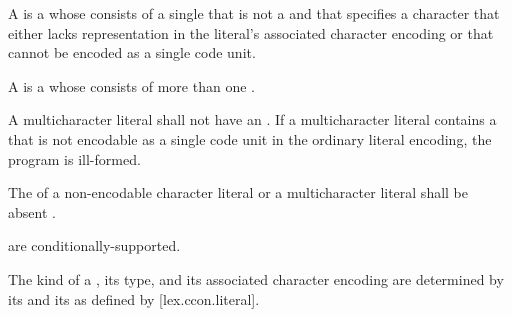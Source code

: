 \documentclass{wg21}
\begin{document}
    \pnum
    \begin{removedblock}
        A 
        is a 
        whose  consists of a single 
        that is not a  and
        that specifies a character
        that either lacks representation in the literal's associated character encoding
        or that cannot be encoded as a single code unit.
    \end{removedblock}
    A  is a 
    whose  consists of
    more than one .
    \begin{addedblock}
        A multicharacter literal shall not have an .
        If a multicharacter literal contains a  that is not encodable as a single code unit in the ordinary literal encoding, the program is ill-formed.
    \end{addedblock}

    \begin{removedblock}
        The  of
        a non-encodable character literal or
        a multicharacter literal
        shall be absent .
    \end{removedblock}

     are conditionally-supported.

    \pnum
    The kind of a ,
    its type, and its associated character encoding
    are determined by
    its  and its 
    as defined by [lex.ccon.literal].
\end{document}
